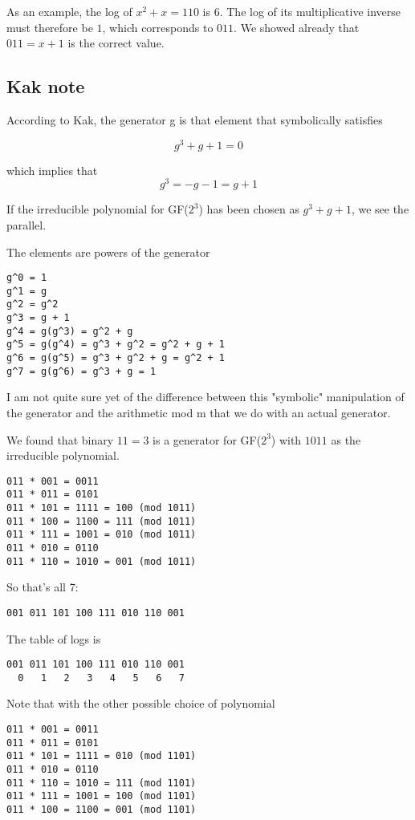 \documentclass[11pt, oneside]{article}
\begin{document}
As an example, the log of $x^2 + x = 110$ is $6$.  The log of its multiplicative inverse must therefore be $1$, which corresponds to $011$.  We showed already that $011 = x + 1$ is the correct value.

\subsection*{Kak note}
According to Kak, the generator g is that element that symbolically satisfies 

\[ g^3 + g + 1 = 0 \]

which implies that
\[ g^3 = -g - 1 = g + 1\]

If the irreducible polynomial for GF($2^3$) has been chosen as $g^3 + g + 1$, we see the parallel.

The elements are powers of the generator
\begin{verbatim}
g^0 = 1
g^1 = g
g^2 = g^2
g^3 = g + 1
g^4 = g(g^3) = g^2 + g
g^5 = g(g^4) = g^3 + g^2 = g^2 + g + 1
g^6 = g(g^5) = g^3 + g^2 + g = g^2 + 1
g^7 = g(g^6) = g^3 + g = 1
\end{verbatim}

I am not quite sure yet of the difference between this "symbolic" manipulation of the generator and the arithmetic mod m that we do with an actual generator.

We found that binary $11 = 3$ is a generator for GF($2^3$) with $1011$ as the irreducible polynomial.

\begin{verbatim}
011 * 001 = 0011
011 * 011 = 0101
011 * 101 = 1111 = 100 (mod 1011)
011 * 100 = 1100 = 111 (mod 1011)
011 * 111 = 1001 = 010 (mod 1011)
011 * 010 = 0110
011 * 110 = 1010 = 001 (mod 1011)
\end{verbatim}

So that's all 7:
\begin{verbatim}
001 011 101 100 111 010 110 001
\end{verbatim}

The table of logs is
\begin{verbatim}
001 011 101 100 111 010 110 001
  0   1   2   3   4   5   6   7
\end{verbatim}

Note that with the other possible choice of polynomial

\begin{verbatim}
011 * 001 = 0011
011 * 011 = 0101
011 * 101 = 1111 = 010 (mod 1101)
011 * 010 = 0110
011 * 110 = 1010 = 111 (mod 1101)
011 * 111 = 1001 = 100 (mod 1101)
011 * 100 = 1100 = 001 (mod 1101)
\end{verbatim}
\end{document}
